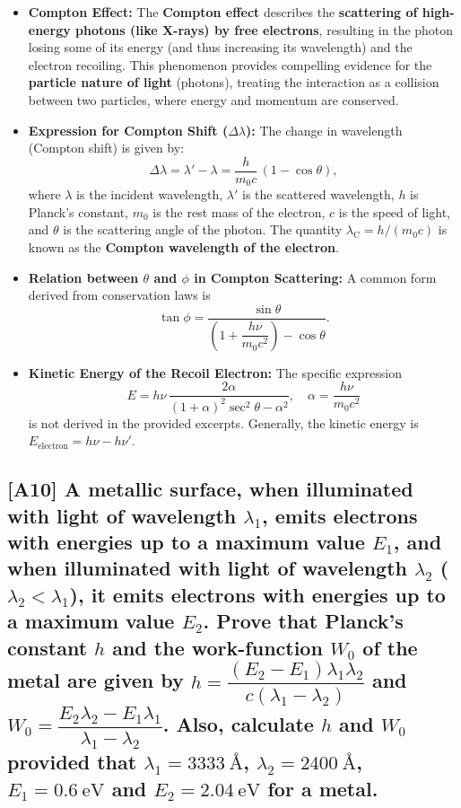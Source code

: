 \documentclass[12pt]{article}
\begin{document}
\begin{itemize}
    \item \textbf{Compton Effect:} The \textbf{Compton effect} describes the \textbf{scattering of high-energy photons (like X-rays) by free electrons}, resulting in the photon losing some of its energy (and thus increasing its wavelength) and the electron recoiling. This phenomenon provides compelling evidence for the \textbf{particle nature of light} (photons), treating the interaction as a collision between two particles, where energy and momentum are conserved.
    \item \textbf{Expression for Compton Shift ($\Delta\lambda$):} The change in wavelength (Compton shift) is given by:
    \[
      \Delta\lambda=\lambda'-\lambda=\frac{h}{m_0c}\,(1-\cos\theta),
    \]
    where $\lambda$ is the incident wavelength, $\lambda'$ is the scattered wavelength, $h$ is Planck's constant, $m_0$ is the rest mass of the electron, $c$ is the speed of light, and $\theta$ is the scattering angle of the photon. The quantity $\lambda_{\text{C}}=h/(m_0c)$ is known as the \textbf{Compton wavelength of the electron}.
    \item \textbf{Relation between $\theta$ and $\phi$ in Compton Scattering:} A common form derived from conservation laws is
    \[
      \tan\phi=\frac{\sin\theta}{\left(1+\dfrac{h\nu}{m_0c^2}\right)-\cos\theta}.
    \]
    \item \textbf{Kinetic Energy of the Recoil Electron:} The specific expression
    \[
      E=h\nu\,\frac{2\alpha}{(1+\alpha)^2\sec^2\theta-\alpha^2},\quad \alpha=\frac{h\nu}{m_0c^2}
    \]
    is not derived in the provided excerpts. Generally, the kinetic energy is $E_{\text{electron}}=h\nu-h\nu'$.
\end{itemize}

\subsection{[A10] A metallic surface, when illuminated with light of wavelength $\lambda_1$, emits electrons with energies up to a maximum value $E_1$, and when illuminated with light of wavelength $\lambda_2$ ($\lambda_2<\lambda_1$), it emits electrons with energies up to a maximum value $E_2$. Prove that Planck's constant $h$ and the work-function $W_0$ of the metal are given by $h=\dfrac{(E_2-E_1)\lambda_1\lambda_2}{c(\lambda_1-\lambda_2)}$ and $W_0=\dfrac{E_2\lambda_2-E_1\lambda_1}{\lambda_1-\lambda_2}$. Also, calculate $h$ and $W_0$ provided that $\lambda_1=3333\ \text{\AA}$, $\lambda_2=2400\ \text{\AA}$, $E_1=0.6\ \text{eV}$ and $E_2=2.04\ \text{eV}$ for a metal.}
\end{document}
